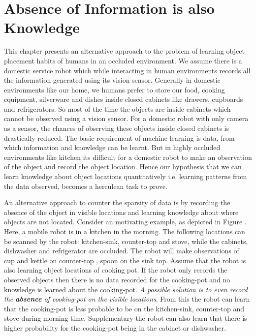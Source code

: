 

\chapter{Absence of Information is also Knowledge}

This chapter presents an alternative approach to the problem of learning object placement habits of humans in an occluded environment. We assume there is a domestic service robot which while interacting in human environments records all the information generated using its vision sensor.
Generally in domestic environments like our home, we humans prefer to store our food, cooking equipment, silverware and dishes inside closed cabinets like drawers, cupboards and refrigerators. So most of the time the objects are inside cabinets which cannot be observed using a vision sensor. For a domestic robot with only camera as a sensor, the chances of observing  these objects inside closed cabinets is drastically reduced.
The basic requirement of machine learning is data, from which information and knowledge can be learnt. But in highly occluded environments like kitchen its difficult for a domestic robot to make an observation of the object and record the object location.  Hence our hypothesis that we can learn knowledge about object locations quantitatively i.e. learning patterns from the data observed, becomes a herculean task to prove.

An alternative approach to counter the sparsity of data is by recording the absence of the object in visible locations and learning knowledge about where objects are not located. Consider an motivating example, as depicted in Figure \cite{fig:alllocations} . Here, a mobile robot is in a kitchen in the morning. The following locations can be scanned by the robot: kitchen-sink, counter-top and stove, while the cabinets, dishwasher and refrigerator are occluded. The robot will make observations of cup and kettle on counter-top , spoon on the sink top. Assume that the robot is also learning object locations of cooking pot. If the robot only records the observed objects then there is no data recorded for the cooking-pot and no knowledge is learned about the cooking-pot. \emph{A possible solution is to even record the \textbf{absence} of cooking-pot on the visible locations}. From this the robot can learn that the cooking-pot is less probable to be on the kitchen-sink, counter-top and stove during morning time. Supplementary the robot can also learn that there is higher probability for the cooking-pot being in the cabinet or dishwasher.

